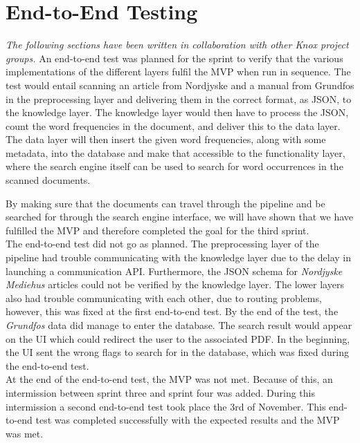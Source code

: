 \chapter{End-to-End Testing}\label{scrumofscrumendtotend}
\textit{The following sections have been written in collaboration with other Knox project groups.}
An end-to-end test was planned for the sprint to verify that the various implementations of the different layers fulfil the MVP when run in sequence. The test would entail scanning an article from Nordjyske and a manual from Grundfos in the preprocessing layer and delivering them in the correct format, as JSON, to the knowledge layer. The knowledge layer would then have to process the JSON, count the word frequencies in the document, and deliver this to the data layer. The data layer will then insert the given word frequencies, along with some metadata, into the database and make that accessible to the functionality layer, where the search engine itself can be used to search for word occurrences in the scanned documents.

By making sure that the documents can travel through the pipeline and be searched for through the search engine interface, we will have shown that we have fulfilled the MVP and therefore completed the goal for the third sprint.\\

The end-to-end test did not go as planned. The preprocessing layer of the pipeline had trouble communicating with the knowledge layer due to the delay in launching a communication API. Furthermore, the JSON schema for \textit{Nordjyske Mediehus} articles could not be verified by the knowledge layer.
The lower layers also had trouble communicating with each other, due to routing problems, however, this was fixed at the first end-to-end test. By the end of the test, the \textit{Grundfos} data did manage to enter the database. The search result would appear on the UI which could redirect the user to the associated PDF. In the beginning, the UI sent the wrong flags to search for in the database, which was fixed during the end-to-end test.\\

At the end of the end-to-end test, the MVP was not met. Because of this, an intermission between sprint three and sprint four was added. During this intermission a second end-to-end test took place the 3rd of November. This end-to-end test was completed successfully with the expected results and the MVP was met.